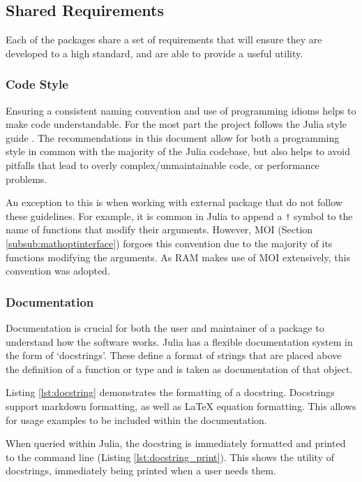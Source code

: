 \subsection{Shared Requirements}
Each of the packages share a set of requirements that will ensure they are developed to a high standard, and are able to provide a useful utility. 



\subsubsection{Code Style}
Ensuring a consistent naming convention and use of programming idioms helps to make code understandable. For the most part the project follows the Julia style guide \cite{JuliaGuide}. The recommendations in this document allow for both a programming style in common with the majority of the Julia codebase, but also helps to avoid pitfalls that lead to overly complex/unmaintainable code, or performance problems.

An exception to this is when working with external package that do not follow these guidelines. For example, it is common in Julia to append a \texttt{!} symbol to the name of functions that modify their arguments. However, \ac{MOI} (Section \ref{subsub:mathoptinterface}) forgoes this convention due to the majority of its functions modifying the arguments. As \ac{RAM} makes use of \ac{MOI} extensively, this convention was adopted.

\subsubsection{Documentation}
Documentation is crucial for both the user and maintainer of a package to understand how the software works. Julia has a flexible documentation system in the form of `docstrings'. These define a format of strings that are placed above the definition of a function or type and is taken as documentation of that object. 

Listing \ref{lst:docstring} demonstrates the formatting of a docstring. Docstrings support markdown formatting, as well as LaTeX equation formatting. This allows for usage examples to be included within the documentation.

When queried within Julia, the docstring is immediately formatted and printed to the command line (Listing \ref{lst:docstring_print}). This shows the utility of docstrings, immediately being printed when a user needs them.


